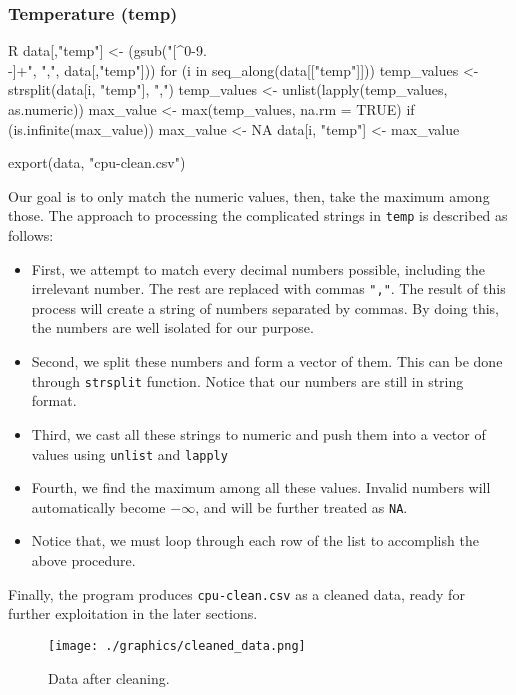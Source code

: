 \subsubsection*{Temperature (temp)}

\begin{code}{R}
data[,"temp"] <- (gsub("[^0-9.\\-]+", ",", data[,"temp"]))
for (i in seq_along(data[["temp"]])) {
    temp_values <- strsplit(data[i, "temp"], ",") 
    temp_values <- unlist(lapply(temp_values, as.numeric))
    max_value <- max(temp_values, na.rm = TRUE)
    if (is.infinite(max_value)) {
        max_value <- NA
    }
    data[i, "temp"] <- max_value
}

export(data, "cpu-clean.csv")
\end{code}

Our goal is to only match the numeric values, then, take the maximum among those. The approach to processing the complicated strings in \verb|temp| is described as follows:
\begin{itemize}
    \item First, we attempt to match every decimal numbers possible, including the irrelevant number. The rest are replaced with commas \verb|","|.
    The result of this process will create a string of numbers separated by commas. By doing this, the numbers are well isolated for our purpose.

    \item Second, we split these numbers and form a vector of them. This can be done through \texttt{strsplit} function. Notice that our numbers
    are still in string format.

    \item Third, we cast all these strings to numeric and push them into a vector of values using \texttt{unlist} and \texttt{lapply}
    
    \item Fourth, we find the maximum among all these values. Invalid numbers will automatically become \(-\infty\), and will be further treated as \texttt{NA}.
    
    \item Notice that, we must loop through each row of the list to accomplish the above procedure.
\end{itemize}

Finally, the program produces \verb|cpu-clean.csv| as a cleaned data, ready for further exploitation in the later sections.

\begin{figure}[H]
    \centering
    \texttt{[image: ./graphics/cleaned\_data.png]}
    \caption{Data after cleaning.}
\end{figure}


